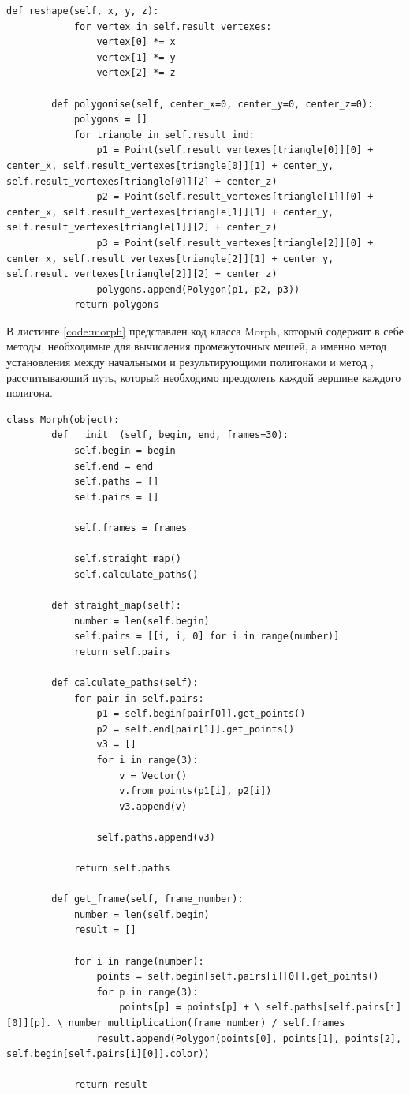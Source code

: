 \begin{lstlisting}[caption= Класс эллипсоида, label=code:ellipse]
		def reshape(self, x, y, z):
			for vertex in self.result_vertexes:
				vertex[0] *= x
				vertex[1] *= y
				vertex[2] *= z
			
		def polygonise(self, center_x=0, center_y=0, center_z=0):
			polygons = []
			for triangle in self.result_ind:
				p1 = Point(self.result_vertexes[triangle[0]][0] + center_x, self.result_vertexes[triangle[0]][1] + center_y, self.result_vertexes[triangle[0]][2] + center_z)
				p2 = Point(self.result_vertexes[triangle[1]][0] + center_x, self.result_vertexes[triangle[1]][1] + center_y, self.result_vertexes[triangle[1]][2] + center_z)
				p3 = Point(self.result_vertexes[triangle[2]][0] + center_x, self.result_vertexes[triangle[2]][1] + center_y, self.result_vertexes[triangle[2]][2] + center_z)
				polygons.append(Polygon(p1, p2, p3))
			return polygons
\end{lstlisting}

В листинге \ref{code:morph} представлен код класса Morph, который содержит в себе методы, необходимые для вычисления промежуточных мешей, а именно метод установления между начальными и результирующими полигонами  и метод , рассчитывающий путь, который необходимо преодолеть каждой вершине каждого полигона.
\begin{lstlisting}[caption= Класс морфинга, label=code:morph]
	class Morph(object):
		def __init__(self, begin, end, frames=30):
			self.begin = begin
			self.end = end
			self.paths = []
			self.pairs = []
			
			self.frames = frames
			
			self.straight_map()
			self.calculate_paths()
			
		def straight_map(self):
			number = len(self.begin)
			self.pairs = [[i, i, 0] for i in range(number)]
			return self.pairs
		
		def calculate_paths(self):			
			for pair in self.pairs:
				p1 = self.begin[pair[0]].get_points()
				p2 = self.end[pair[1]].get_points()
				v3 = []
				for i in range(3):
					v = Vector()
					v.from_points(p1[i], p2[i])
					v3.append(v)
				
				self.paths.append(v3)
			
			return self.paths
		
		def get_frame(self, frame_number):
			number = len(self.begin)
			result = []
			
			for i in range(number):
				points = self.begin[self.pairs[i][0]].get_points()
				for p in range(3):
					points[p] = points[p] + \ self.paths[self.pairs[i][0]][p]. \ number_multiplication(frame_number) / self.frames
				result.append(Polygon(points[0], points[1], points[2], self.begin[self.pairs[i][0]].color))
			
			return result
\end{lstlisting}

